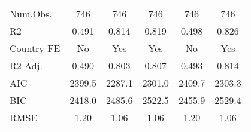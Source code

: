 \begin{table}
\begin{tabular}[t]{lccccc}
\midrule
Num.Obs. & \num{746} & \num{746} & \num{746} & \num{746} & \num{746}\\
R2 & \num{0.491} & \num{0.814} & \num{0.819} & \num{0.498} & \num{0.826}\\
Country FE & No & Yes & Yes & No & Yes\\
R2 Adj. & \num{0.490} & \num{0.803} & \num{0.807} & \num{0.493} & \num{0.814}\\
AIC & \num{2399.5} & \num{2287.1} & \num{2301.0} & \num{2409.7} & \num{2303.3}\\
BIC & \num{2418.0} & \num{2485.6} & \num{2522.5} & \num{2455.9} & \num{2529.4}\\
RMSE & \num{1.20} & \num{1.06} & \num{1.06} & \num{1.20} & \num{1.06}\\
\bottomrule
\end{tabular}
\end{table}
